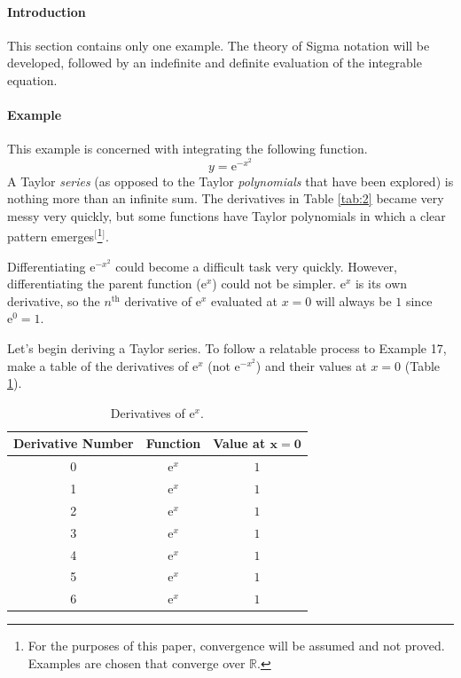 \documentclass{article}
\newcounter{example}%
\newcommand{\ex}{\stepcounter{example} \paragraph{Example \theexample}}
\begin{document}
\paragraph{Introduction} This section contains only one example. The theory of Sigma notation will be developed, followed by an indefinite and definite evaluation of the integrable equation.
\ex This example is concerned with integrating the following function.$$y=\text{e}^{-x^2}$$
A Taylor \emph{series} (as opposed to the Taylor \emph{polynomials} that have been explored) is nothing more than an infinite sum. The derivatives in Table \ref{tab:2} became very messy very quickly, but some functions have Taylor polynomials in which a clear pattern emerges$^[$\footnote{For the purposes of this paper, convergence will be assumed and not proved. Examples are chosen that converge over $\mathbb{R}$.}$^]$.\par
Differentiating $\text{e}^{-x^2}$ could become a difficult task very quickly. However, differentiating the parent function ($\text{e}^x$) could not be simpler. $\text{e}^x$ is its own derivative, so the $n^\text{th}$ derivative of $\text{e}^x$ evaluated at $x=0$ will always be $1$ since $\text{e}^0=1$.\par
Let's begin deriving a Taylor series. To follow a relatable process to Example 17, make a table of the derivatives of $\text{e}^x$ (not $\text{e}^{-x^2}$) and their values at $x=0$ (Table \ref{tab:3}).

\begin{table}[h!]
    \centering
    \begin{tabular}{|c|c|c|}
        \hline
        \textbf{Derivative Number} & \textbf{Function} & \textbf{Value at }$\mathbf{x=0}$\\
        \hline
        0 & $\text{e}^x$ & $1$\\
        \hline
        1 & $\text{e}^x$ & $1$\\
        \hline
        2 & $\text{e}^x$ & $1$\\
        \hline
        3 & $\text{e}^x$ & $1$\\
        \hline
        4 & $\text{e}^x$ & $1$\\
        \hline
        5 & $\text{e}^x$ & $1$\\
        \hline
        6 & $\text{e}^x$ & $1$\\
        \hline
    \end{tabular}
    \caption{Derivatives of $\text{e}^x$.}
    \label{tab:3}
\end{table}
\end{document}
